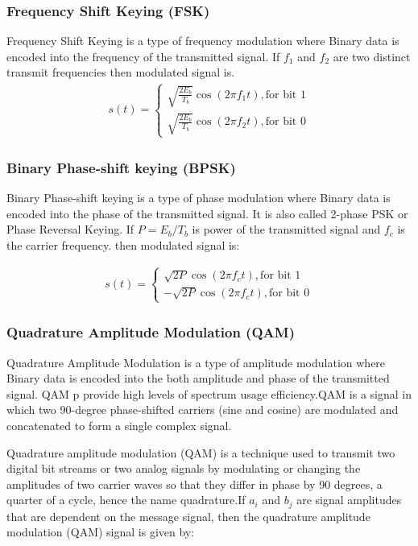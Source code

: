 \documentclass[a4paper,11pt]{article}
\begin{document}
\subsubsection{Frequency Shift Keying (FSK)}
Frequency Shift Keying is a type of frequency modulation where Binary data is encoded into the frequency of the transmitted signal. If $f_1$ and $f_2$ are two distinct transmit frequencies then modulated signal is.
\begin{align*}
    s(t) =
    \begin{cases}
        \sqrt{\frac{2E_b}{T_b}}\cos{(2\pi f_1 t)}, \text{for bit 1} \\
        \sqrt{\frac{2E_b}{T_b}}\cos{(2\pi f_2 t)}, \text{for bit 0}
    \end{cases}
\end{align*}



\subsubsection{Binary Phase-shift keying (BPSK)}
Binary Phase-shift keying is a type of phase modulation where Binary data is encoded into the phase of the transmitted signal. It is also called 2-phase PSK or Phase Reversal Keying. If $P = E_b/T_b$ is power of the transmitted signal and $f_c$ is the carrier frequency. then modulated signal is:

\begin{align*}
    s(t) =
    \begin{cases}
        \sqrt{2P}\cos{(2\pi f_c t)}, \text{for bit 1} \\
        -\sqrt{2P}\cos{(2\pi f_c t)}, \text{for bit 0}
    \end{cases}
\end{align*}



\subsubsection{Quadrature Amplitude Modulation (QAM)}
Quadrature Amplitude Modulation is a type of amplitude modulation where Binary data is encoded into the both amplitude and phase of the transmitted signal. QAM p provide high levels of spectrum usage efficiency.QAM is a signal in which two 90-degree phase-shifted carriers (sine and cosine) are modulated and concatenated to form a single complex signal.

Quadrature amplitude modulation (QAM) is a technique used to transmit two digital bit streams or two analog signals by modulating or changing the amplitudes of two carrier waves so that they differ in phase by 90 degrees, a quarter of a cycle, hence the name quadrature.If $a_i$ and $b_j$ are signal amplitudes that are dependent on the message signal, then the quadrature amplitude modulation (QAM) signal is given by:
\end{document}
